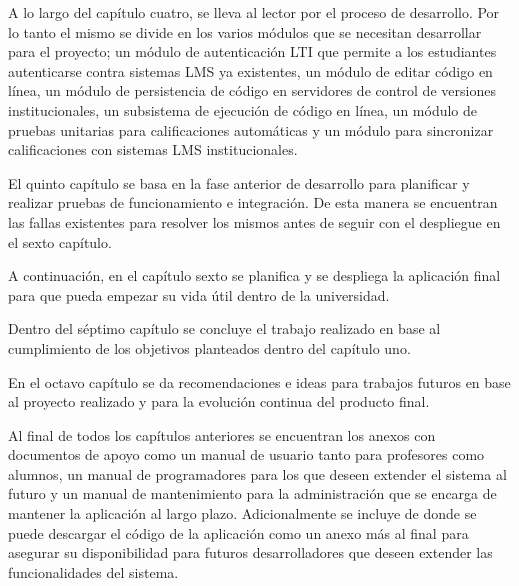 A lo largo del capítulo cuatro, se lleva al lector por el proceso de desarrollo. Por lo tanto el mismo se divide en los varios módulos que se necesitan desarrollar para el proyecto; un módulo de autenticación LTI que permite a los estudiantes autenticarse contra sistemas LMS ya existentes, un módulo de editar código en línea, un módulo de persistencia de código en servidores de control de versiones institucionales, un subsistema de ejecución de código en línea, un módulo de pruebas unitarias para calificaciones automáticas y un módulo para sincronizar calificaciones con sistemas LMS institucionales.
 
El quinto capítulo se basa en la fase anterior de desarrollo para planificar y realizar pruebas de funcionamiento e integración. De esta manera se encuentran las fallas existentes para resolver los mismos antes de seguir con el despliegue en el sexto capítulo.
 
A continuación, en el capítulo sexto se planifica y se despliega la aplicación final para que pueda empezar su vida útil dentro de la universidad.
 
Dentro del séptimo capítulo se concluye el trabajo realizado en base al cumplimiento de los objetivos planteados dentro del capítulo uno.
 
En el octavo capítulo se da recomendaciones e ideas para trabajos futuros en base al proyecto realizado y para la evolución continua del producto final.

Al final de todos los capítulos anteriores se encuentran los anexos con documentos de apoyo como un manual de usuario tanto para profesores como alumnos, un manual de programadores para los que deseen extender el sistema al futuro y un manual de mantenimiento para la administración que se encarga de mantener la aplicación al largo plazo. Adicionalmente se incluye de donde se puede descargar el código de la aplicación como un anexo más al final para asegurar su disponibilidad para futuros desarrolladores que deseen extender las funcionalidades del sistema.

